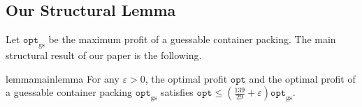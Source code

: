 \documentclass[10pt,a4paper]{amsart}
\newcommand{\kvn}[1]{#1}
\newcommand{\kvnr}[1]{}
\newcommand{\eps}{\varepsilon}
\renewcommand{\epsilon}{\varepsilon} %
\newcommand{\AM}{\mathcal{A}}
\newcommand{\NFDH}{\texttt{NFDH}\xspace}
\newcommand{\tNFDH}{\texttt{3D-NFDH}\xspace}
\theoremstyle{definition}
\newcommand{\opt}{\mathtt{opt}}
\newcommand{\optgs}{\mathtt{opt}_{\mathrm{gs}}}
\begin{document}



\subsection{Our Structural Lemma}
Let $\optgs$ be the maximum profit of a guessable container packing. The main structural result of our paper is the following.


\begin{restatable}{lemma}{mainlemma}
\label{thm:mainthm}
For any $\epsilon > 0$, the optimal profit $\opt$ and the optimal profit of a guessable container packing $\optgs$ satisfies $\opt \le \left(\frac{139}{29}+\epsilon\right)\optgs$.
\end{restatable}
\end{document}
